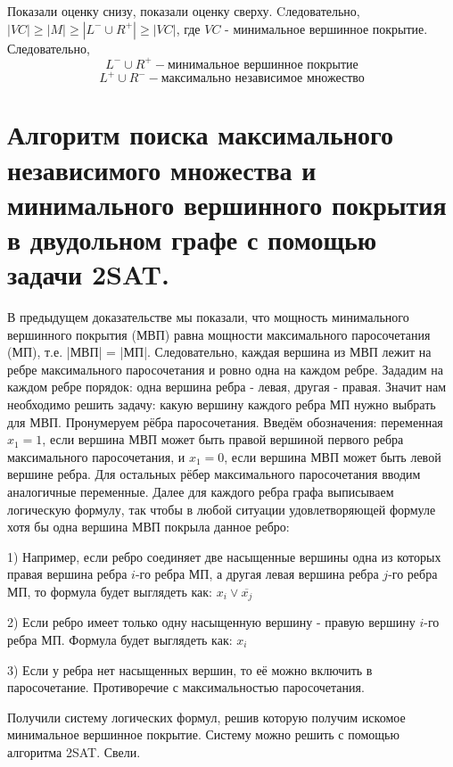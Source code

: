 Показали оценку снизу, показали оценку сверху. Cледовательно, $|VC| \geq |M| \geq |L^- \cup R^+| \geq |VC|$, где $VC$ - минимальное вершинное покрытие. 
Следовательно,
$$L^- \cup R^+ - \text{минимальное вершинное покрытие}$$
$$L^+ \cup R^- - \text{максимально независимое множество}$$

\setcounter{section}{70}
\section{Алгоритм поиска максимального независимого множества и минимального вершинного покрытия в двудольном графе с помощью задачи 2SAT.}

В предыдущем доказательстве мы показали, что мощность минимального вершинного покрытия (МВП) равна мощности максимального паросочетания (МП), т.е. |МВП| = |МП|. Следовательно, каждая вершина из МВП лежит на ребре максимального паросочетания и ровно одна на каждом ребре. Зададим на каждом ребре порядок: одна вершина ребра - левая, другая - правая. Значит нам необходимо решить задачу: какую вершину каждого ребра МП нужно выбрать для МВП. Пронумеруем рёбра паросочетания. Введём обозначения: переменная $x_1 = 1$, если вершина МВП может быть правой вершиной первого ребра максимального паросочетания, и  $x_1 = 0$, если вершина МВП может быть левой вершине ребра. Для остальных рёбер максимального паросочетания вводим аналогичные переменные. Далее для каждого ребра графа выписываем логическую формулу, так чтобы в любой ситуации удовлетворяющей формуле хотя бы одна вершина МВП покрыла данное ребро:

1) Например, если ребро соединяет две насыщенные вершины одна из которых правая вершина ребра $i$-го ребра МП, а другая левая вершина ребра $j$-го ребра МП, то формула будет выглядеть как: $x_i \vee \overline{x_j}$

2) Если ребро имеет только одну насыщенную вершину - правую вершину $i$-го ребра МП. Формула будет выглядеть как: $x_i$

3) Если у ребра нет насыщенных вершин, то её можно включить в паросочетание. Противоречие с максимальностью паросочетания.

Получили систему логических формул, решив которую получим искомое минимальное вершинное покрытие. Систему можно решить с помощью алгоритма 2SAT. Свели.